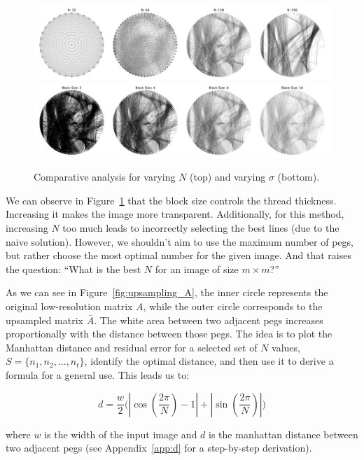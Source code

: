 \begin{figure}[H]
    \centering
    \includegraphics[width=\linewidth]{images/tuning/lls_column_2_as_row.pdf}
    \includegraphics[width=\linewidth]{images/tuning/lls_row_2.pdf}
    \caption{Comparative analysis for varying \(N\) (top) and varying \(\sigma\) (bottom).}
    \label{fig:n_sigma_tuning}
\end{figure}

We can observe in Figure~\ref{fig:n_sigma_tuning} that the block size controls the thread thickness. Increasing it makes the image more transparent. Additionally, for this method, increasing \(N\) too much leads to incorrectly selecting the best lines (due to the naive solution). However, we shouldn't aim to use the maximum number of pegs, but rather choose the most optimal number for the given image. And that raises the question: \enquote{What is the best \(N\) for an image of size \(m \times m\)?}

As we can see in Figure~\ref{fig:upsampling_A}, the inner circle represents the original low-resolution matrix \(A\), while the outer circle corresponds to the upsampled matrix \(\bar{A}\). The white area between two adjacent pegs increases proportionally with the distance between those pegs. The idea is to plot the Manhattan distance and residual error for a selected set of \(N\) values, \(S = \{n_1, n_2, \ldots, n_t\}\), identify the optimal distance, and then use it to derive a formula for a general use. This leads us to:

\[
d = \frac{w}{2}\bigg(\left| \cos(\frac{2\pi}{N}) - 1 \right| + \left|  \sin(\frac{2\pi}{N})\right|\bigg)
\]

where \(w\) is the width of the input image and \(d\) is the manhattan distance between two adjacent pegs (see Appendix~\ref{app:d} for a step-by-step derivation). 

